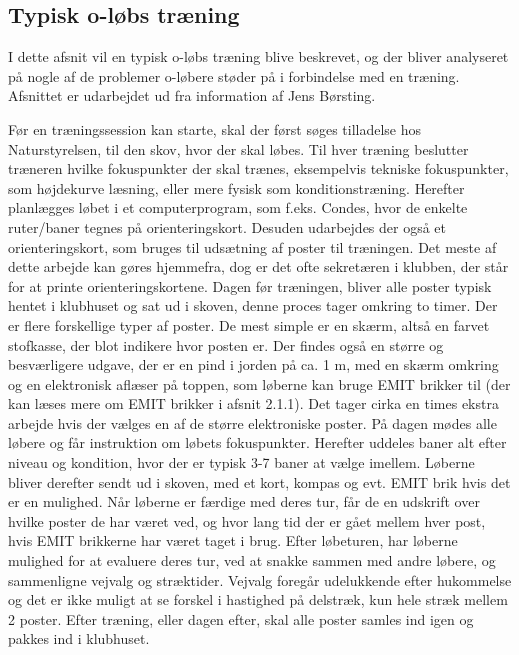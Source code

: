\subsection{Typisk o-løbs træning}
I dette afsnit vil en typisk o-løbs træning blive beskrevet, og der bliver analyseret på nogle af de problemer o-løbere støder på i forbindelse med en træning. Afsnittet er udarbejdet ud fra information af Jens Børsting.

Før en træningssession kan starte, skal der først søges tilladelse hos Naturstyrelsen, til den skov, hvor der skal løbes. \newline
Til hver træning beslutter træneren hvilke fokuspunkter der skal trænes, eksempelvis tekniske fokuspunkter, som højdekurve læsning, eller mere fysisk som konditionstræning. Herefter planlægges løbet i et computerprogram, som f.eks. Condes, hvor de enkelte ruter/baner tegnes på orienteringskort. Desuden udarbejdes der også et orienteringskort, som bruges til udsætning af poster til træningen. Det meste af dette arbejde kan gøres hjemmefra, dog er det ofte sekretæren i klubben, der står for at printe orienteringskortene. Dagen før træningen, bliver alle poster typisk hentet i klubhuset og sat ud i skoven, denne proces tager omkring to timer. Der er flere forskellige typer af poster. De mest simple er en skærm, altså en farvet stofkasse, der blot indikere hvor posten er. Der findes også en større og besværligere udgave, der er en pind i jorden på ca. 1 m, med en skærm omkring og en elektronisk aflæser på toppen, som løberne kan bruge EMIT brikker til (der kan læses mere om EMIT brikker i afsnit 2.1.1). Det tager cirka en times ekstra arbejde hvis der vælges en af de større elektroniske poster.\newline
På dagen mødes alle løbere og får instruktion om løbets fokuspunkter. Herefter uddeles baner alt efter niveau og kondition, hvor der er typisk 3-7 baner at vælge imellem. Løberne bliver derefter sendt ud i skoven, med et kort, kompas og evt. EMIT brik hvis det er en mulighed. Når løberne er færdige med deres tur, får de en udskrift over hvilke poster de har været ved, og hvor lang tid der er gået mellem hver post, hvis EMIT brikkerne har været taget i brug.
Efter løbeturen, har løberne mulighed for at evaluere deres tur, ved at snakke sammen med andre løbere, og sammenligne vejvalg og stræktider. Vejvalg foregår udelukkende efter hukommelse og det er ikke muligt at se forskel i hastighed på delstræk, kun hele stræk mellem 2 poster. 
Efter træning, eller dagen efter, skal alle poster samles ind igen og pakkes ind i klubhuset.\newline


